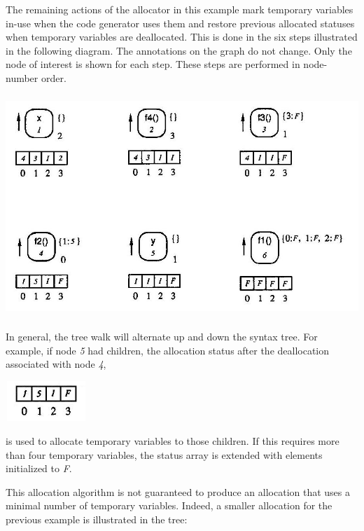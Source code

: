 The remaining actions of the allocator in this example mark temporary
variables in-use when the code generator uses them and restore
previous allocated statuses when temporary variables are
deallocated. This is done in the six steps illustrated in the
following diagram. The annotations on the graph do not change. Only
the node of interest is shown for each step. These steps are performed
in node-number order.

{\centering{}
 \includegraphics[width=6.0in,height=3.3in]{kw/figure8-6.png}  
\par}


In general, the tree walk will alternate up and down the syntax
tree. For example, if node \textit{5} had children, the allocation
status after the deallocation associated with node \textit{4},

{\centering{}
 \includegraphics[width=1.2in,height=0.6in]{kw/figure8-6-5.png}  
\par}

\noindent is used to allocate temporary variables to those
children. If this requires more than four temporary variables, the
status array is extended with elements initialized to \textit{F}.

This allocation algorithm is not guaranteed to produce an allocation
that uses a minimal number of temporary variables.  Indeed, a smaller
allocation for the previous example is illustrated in the tree:

